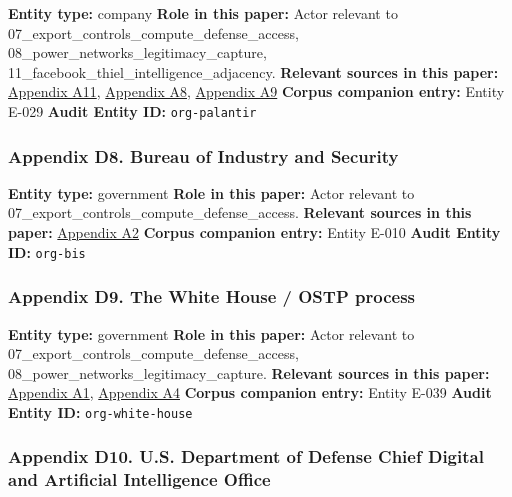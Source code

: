 \documentclass[
  american,
  11pt,
  letterpaper,
]{article}
\begin{document}
\textbf{Entity type:} company \textbf{Role in this paper:} Actor
relevant to 07\_export\_controls\_compute\_defense\_access,
08\_power\_networks\_legitimacy\_capture,
11\_facebook\_thiel\_intelligence\_adjacency. \textbf{Relevant sources
in this paper:} \hyperref[ch-07-appendix-a11-gotham]{Appendix A11},
\hyperref[ch-07-appendix-a8-anthropic-and-palantir-partner-to-bring-claude-ai-models-to-aws-for-u-s-government-intelligence-and-defense-operations]{Appendix
A8},
\hyperref[ch-07-appendix-a9-army-launches-detachment-201-executive-innovation-corps-to-drive-tech-transformation]{Appendix
A9} \textbf{Corpus companion entry:} Entity E-029 \textbf{Audit Entity
ID:} \texttt{org-palantir}

\subsubsection{Appendix D8. Bureau of Industry and
Security}\label{ch-07-appendix-d8-bureau-of-industry-and-security}

\textbf{Entity type:} government \textbf{Role in this paper:} Actor
relevant to 07\_export\_controls\_compute\_defense\_access.
\textbf{Relevant sources in this paper:}
\hyperref[ch-07-appendix-a2-guidance-regarding-enforcement-of-license-requirements-for-advanced-computing-items-for-entities-headquartered-in-country-group-d-5-and-macau]{Appendix
A2} \textbf{Corpus companion entry:} Entity E-010 \textbf{Audit Entity
ID:} \texttt{org-bis}

\subsubsection{Appendix D9. The White House / OSTP
process}\label{ch-07-appendix-d9-the-white-house-ostp-process}

\textbf{Entity type:} government \textbf{Role in this paper:} Actor
relevant to 07\_export\_controls\_compute\_defense\_access,
08\_power\_networks\_legitimacy\_capture. \textbf{Relevant sources in
this paper:}
\hyperref[ch-07-appendix-a1-removing-barriers-to-american-leadership-in-artificial-intelligence]{Appendix
A1},
\hyperref[ch-07-appendix-a4-request-for-information-on-the-development-of-an-artificial-intelligence-ai-action-plan]{Appendix
A4} \textbf{Corpus companion entry:} Entity E-039 \textbf{Audit Entity
ID:} \texttt{org-white-house}

\subsubsection{Appendix D10. U.S. Department of Defense Chief Digital
and Artificial Intelligence
Office}\label{ch-07-appendix-d10-u-s-department-of-defense-chief-digital-and-artificial-intelligence-office}
\end{document}
